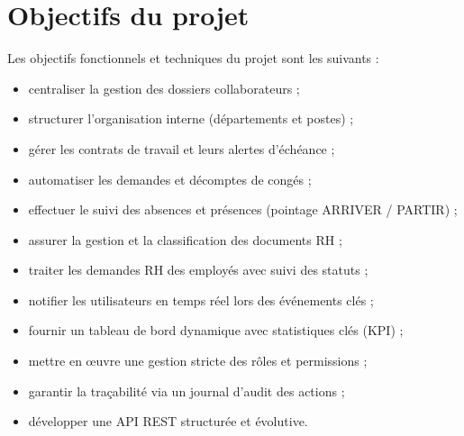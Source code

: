 \documentclass[12pt,a4paper]{report}
\begin{document}
\section{Objectifs du projet}
Les objectifs fonctionnels et techniques du projet sont les suivants :
\begin{itemize}
    \item centraliser la gestion des dossiers collaborateurs ;
    \item structurer l'organisation interne (départements et postes) ;
    \item gérer les contrats de travail et leurs alertes d'échéance ;
    \item automatiser les demandes et décomptes de congés ;
    \item effectuer le suivi des absences et présences (pointage ARRIVER / PARTIR) ;
    \item assurer la gestion et la classification des documents RH ;
    \item traiter les demandes RH des employés avec suivi des statuts ;
    \item notifier les utilisateurs en temps réel lors des événements clés ;
    \item fournir un tableau de bord dynamique avec statistiques clés (KPI) ;
    \item mettre en œuvre une gestion stricte des rôles et permissions ;
    \item garantir la traçabilité via un journal d'audit des actions ;
    \item développer une API REST structurée et évolutive.
\end{itemize}
\end{document}
